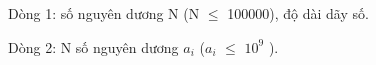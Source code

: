 Dòng 1: số nguyên dương N (N  $\le$  100000), độ dài dãy số.

Dòng 2: N số nguyên dương $a_{i}$ ($a_{i}$  $\le$  $10^{9}$ ).